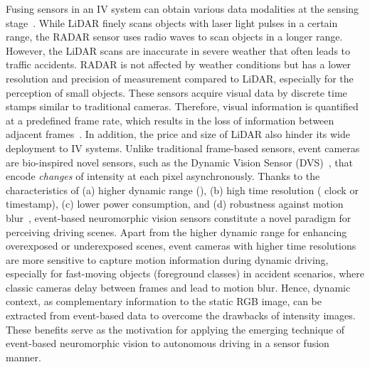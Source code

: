 \documentclass[journal]{IEEEtran}
\begin{document}
Fusing sensors in an IV system can obtain various data modalities at the sensing stage~\cite{sun2019multimodal}. While LiDAR finely scans objects with laser light pulses in a certain range, the RADAR sensor uses radio waves to scan objects in a longer range. However, the LiDAR scans are inaccurate in severe weather that often leads to traffic accidents. RADAR is not affected by weather conditions but has a lower resolution and precision of measurement compared to LiDAR, especially for the perception of small objects. These sensors acquire visual data by discrete time stamps similar to traditional cameras. Therefore, visual information is quantified at a predefined frame rate, which results in the loss of information between adjacent frames~\cite{chen2020event}. In addition, the price and size of LiDAR also hinder its wide deployment to IV systems. 
Unlike traditional frame-based sensors, event cameras are bio-inspired novel sensors, such as the Dynamic Vision Sensor (DVS)~\cite{patrick2008DVS_sensor}, that encode \emph{changes} of intensity at each pixel asynchronously. Thanks to the characteristics of (a) higher dynamic range (), (b) high time resolution ( clock or  timestamp), (c) lower power consumption, and (d) robustness against motion blur~\cite{gallego2019event_survey}, event-based neuromorphic vision sensors constitute a novel paradigm for perceiving driving scenes.
Apart from the higher dynamic range for enhancing overexposed or underexposed scenes, event cameras with higher time resolutions are more sensitive to capture motion information during dynamic driving, especially for fast-moving objects (foreground classes) in accident scenarios, where classic cameras delay between frames and lead to motion blur.
Hence, dynamic context, as complementary information to the static RGB image, can be extracted from event-based data to overcome the drawbacks of intensity images.
These benefits serve as the motivation for applying the emerging technique of event-based neuromorphic vision to autonomous driving in a sensor fusion manner.
\end{document}
